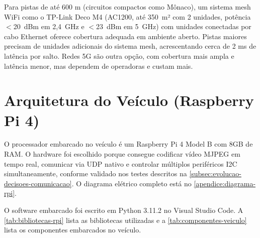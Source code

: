 \begin{table}[!h]
\captionsetup{width=16cm}
\end{table}

Para pistas de até 600 m (circuitos compactos como Mônaco), um sistema mesh WiFi como o TP-Link Deco M4 (AC1200, até 350~m² com 2 unidades, potência $<$20~dBm em 2,4~GHz e $<$23~dBm em 5~GHz) com unidades conectadas por cabo Ethernet oferece cobertura adequada em ambiente aberto. Pistas maiores precisam de unidades adicionais do sistema mesh, acrescentando cerca de 2 ms de latência por salto. Redes 5G são outra opção, com cobertura mais ampla e latência menor, mas dependem de operadoras e custam mais.

\section{Arquitetura do Veículo (Raspberry Pi 4)}
\label{sec:arquitetura-veiculo}

O processador embarcado no veículo é um Raspberry Pi 4 Model B com 8GB de \gls{RAM}. O hardware foi escolhido porque consegue codificar vídeo \gls{MJPEG} em tempo real, comunicar via \gls{UDP} nativo e controlar múltiplos periféricos \gls{I2C} simultaneamente, conforme validado nos testes descritos na \autoref{subsec:evolucao-decisoes-comunicacao}. O diagrama elétrico completo está no \autoref{apendice:diagrama-rpi}.

O software embarcado foi escrito em Python 3.11.2 no Visual Studio Code. A \autoref{tab:bibliotecas-rpi} lista as bibliotecas utilizadas e a \autoref{tab:componentes-veiculo} lista os componentes embarcados no veículo.

